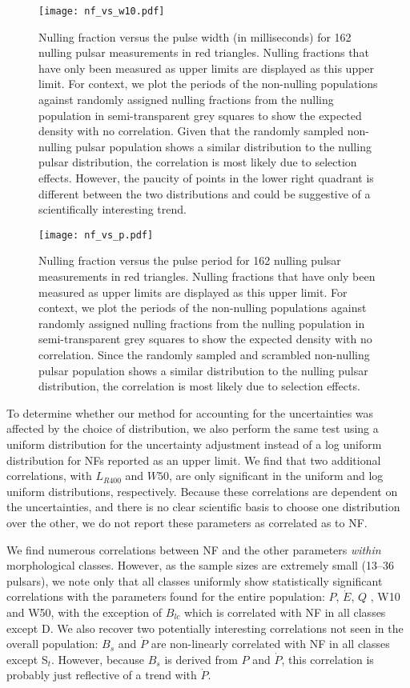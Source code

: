 \documentclass[fleqn,usenatbib]{mnras}
\begin{document}
\begin{figure} 
    \centering
    \texttt{[image: nf\_vs\_w10.pdf]}
    \caption{Nulling fraction versus the pulse width (in milliseconds) for 162 nulling pulsar measurements in red triangles. Nulling fractions that have only been measured as upper limits are displayed as this upper limit. For context, we plot the periods of the non-nulling populations against randomly assigned nulling fractions from the nulling population in semi-transparent grey squares to show the expected density with no correlation. Given that the randomly sampled non-nulling pulsar population shows a similar distribution to the nulling pulsar distribution, the correlation is most likely due to selection effects. However, the paucity of points in the lower right quadrant is different between the two distributions and could be suggestive of a scientifically interesting trend.}
    \label{fig:width_nf}
\end{figure}

\begin{figure} 
    \centering
    \texttt{[image: nf\_vs\_p.pdf]}
    \caption{Nulling fraction versus the pulse period for 162 nulling pulsar measurements in red triangles. Nulling fractions that have only been measured as upper limits are displayed as this upper limit. For context, we plot the periods of the non-nulling populations against randomly assigned nulling fractions from the nulling population in semi-transparent grey squares to show the expected density with no correlation. Since the randomly sampled and scrambled non-nulling pulsar population shows a similar distribution to the nulling pulsar distribution, the correlation is most likely due to selection effects.}
    \label{fig:period_nf}
\end{figure}

To determine whether our method for accounting for the uncertainties was affected by the choice of distribution, we also perform the same test using a uniform distribution for the uncertainty adjustment instead of a log uniform distribution for NFs reported as an upper limit. We find that two additional correlations, with $L_{R400}$ and $W50$, are only significant in the uniform and log uniform distributions, respectively. Because these correlations are dependent on the uncertainties, and there is no clear scientific basis to choose one distribution over the other, we do not report these parameters as correlated as to NF.

We find numerous correlations between NF and the other parameters \textit{within} morphological classes. However, as the sample sizes are extremely small (13--36 pulsars), we note only that all classes uniformly show statistically significant correlations with the parameters found for the entire population: $P$, $\Dot{E}$, $Q$ , W10 and W50, with the exception of $B_{lc}$ which is correlated with NF in all classes except D. We also recover two potentially interesting correlations not seen in the overall population: $B_s$ and $\dot{P}$ are non-linearly correlated with NF in all classes except S$_t$. However, because $B_s$ is derived from $P$ and $\dot{P}$, this correlation is probably just reflective of a trend with $\dot{P}$.
\end{document}
